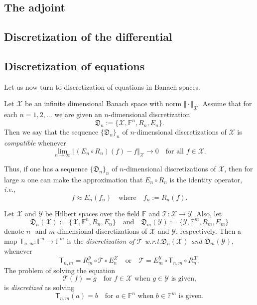 \documentclass[a4paper]{paper}
\newcommand{\discr}{\mathfrak{D}}
\newcommand{\VecSpace}[1]{\mathscr{#1}}
\newcommand{\Field}{\mathbb{F}}
\newcommand{\Op}[1]{\mathcal{#1}}
\newcommand{\DiscOp}[1]{\mathsf{#1}}
\newcommand{\ie}{\textsl{i.e.}\xspace}
\begin{document}
\subsection{The adjoint}


\subsection{Discretization of the differential}

\subsection{Discretization of equations}
Let us now turn to discretization of equations in Banach spaces.
\begin{definition} 
  Let $\VecSpace{X}$ be an infinite dimensional Banach space with norm $\Vert \cdot \Vert_{\VecSpace{X}}$. 
  Assume that for each $n=1,2,\ldots$ we are given an $n$-dimensional  discretization
  \[ \discr_{n} := \{ \VecSpace{X}, \Field^{n}, R_{n},E_{n} \}. \]
  Then we say that the  sequence $\{ \discr_{n} \}_{n}$ of $n$-dimensional discretizations 
  of $\VecSpace{X}$ is \emph{compatible} whenever
  \[ \lim_{n\to \infty} 
     \bigl\Vert ( E_{n}\circ R_{n})(f)-f \bigr\Vert_{\VecSpace{X}}\to 0
    \quad\text{for all $f\in \VecSpace{X}$.}\]
\end{definition}
Thus, if one has a sequence $\{ \discr_{n} \}_{n}$ of $n$-dimensional discretizations 
of $\VecSpace{X}$, then for large $n$ one can make the approximation that 
$E_{n}\circ  R_{n}$ is the identity operator, \ie,
\begin{equation}\label{eq:fApprox}
  f \approx E_{n}(f_{n}) \quad\text{where}\quad
  f_{n}:=R_{n}(f).
\end{equation}
\begin{definition}
  Let $\VecSpace{X}$ and $\VecSpace{Y}$ be Hilbert spaces over the field $\Field$ and $\Op{T} \colon \VecSpace{X} \to \VecSpace{Y}$. 
  Also, let 
  \[  \discr_{n}(\VecSpace{X}):=\bigl\{ \VecSpace{X},\Field^{n},R_{n},E_{n} \bigr\} 
     \quad\text{and}\quad
     \discr_{m}(\VecSpace{Y}):=\bigl\{ \VecSpace{Y},\Field^{m},R_{m},E_{m} \bigr\}\]
  denote $n$- and $m$-dimensional discretizations of $\VecSpace{X}$ and $\VecSpace{Y}$, 
  respectively. Then a map $\DiscOp{T}_{n,m} \colon \Field^{n} \to \Field^{m}$ is the
  \emph{discretization of $\Op{T}$ w.r.t.\@ $\discr_{n}(\VecSpace{X})$ and $\discr_{m}(\VecSpace{Y})$},  
  whenever 
  \[ \DiscOp{T}_{n,m} = R_{m}^{\VecSpace{Y}} \circ \Op{T} \circ E_{n}^{\VecSpace{X}} \quad\text{or}\quad
    \Op{T} = E_{m}^{\VecSpace{Y}} \circ \DiscOp{T}_{n,m} \circ R_{n}^{\VecSpace{X}}. \]
  The problem of  solving the equation
   \[  \Op{T}(f)=g \quad\text{for $f\in \VecSpace{X}$ when $g\in \VecSpace{Y}$ is given,} \]
  is \emph{discretized} as solving 
  \[   \DiscOp{T}_{n,m}(a)=b \quad\text{for $a\in \Field^{n}$ when $b\in \Field^{m}$ is given.} \]
\end{definition}  
\end{document}
